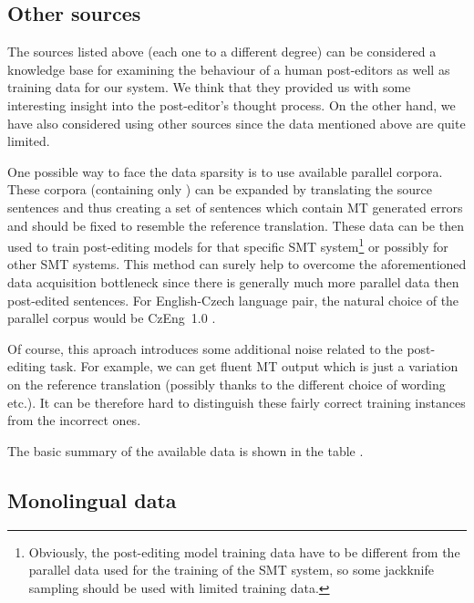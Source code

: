 \subsection{Other sources}

The sources listed above (each one to a different degree) can
be considered a knowledge base for examining the behaviour of a human post-editors as well
as training data for our system. We think that they provided us with
some interesting insight into the post-editor's thought process. On the other hand,
we have also considered using other sources since the data mentioned above are quite
limited.

One possible way to face the data sparsity is to use available parallel corpora.
These corpora (containing only )
can be expanded by translating the source sentences and thus creating a set of 
sentences which contain MT generated errors and should be fixed to resemble the 
reference translation. These data can be then used to train post-editing models for that
specific SMT system\footnote{Obviously, the post-editing model training data have to be
different from the parallel data used for the training of the SMT system, so
some
jackknife sampling should be used with limited training data.} or possibly for
other SMT systems.
This method can surely help to overcome the aforementioned data acquisition bottleneck
since there is generally much more parallel data then post-edited sentences. For
English-Czech language pair, the natural choice of the parallel corpus would be
CzEng~1.0 \cite{czeng10:lrec2012}.


Of course, this aproach introduces some additional noise
related to the post-editing task. For example, we can get fluent MT output which
is just a variation on the reference translation (possibly thanks to the different
choice of wording etc.). It can be therefore hard to distinguish these fairly correct training
instances from the incorrect ones.

The basic summary of the available data is shown in the table .

\subsection{Monolingual data}

